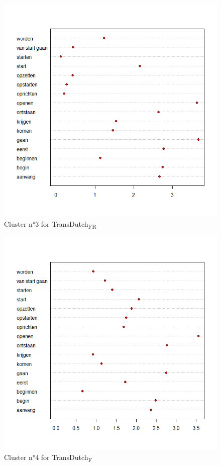 \begin{figure}
\includegraphics[height=.4\textheight]{figures/Vandevoorde2-img84.png}
\caption{\label{fig:4:81}  Cluster n°3 for TransDutch\textsubscript{FR}}
\end{figure}

\begin{figure}
\includegraphics[height=.4\textheight]{figures/Vandevoorde2-img85.png}
\caption{\label{fig:4:82}  Cluster n°4 for TransDutch\textsubscript{F}}
\end{figure}

